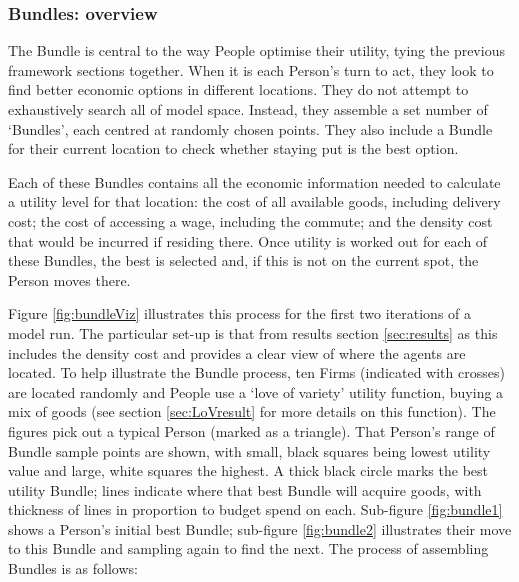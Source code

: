 \subsubsection{Bundles: overview \label{sec:bundles}}

The Bundle is central to the way People optimise their utility, tying the previous framework sections together. When it is each Person's turn to act, they look to find better economic options in different locations. They do not attempt to exhaustively search all of model space. Instead, they assemble a set number of `Bundles', each centred at randomly chosen points. They also include a Bundle for their current location to check whether staying put is the best option.

Each of these Bundles contains all the economic information needed to calculate a utility level for that location: the cost of all available goods, including delivery cost; the cost of accessing a wage, including the commute; and the density cost that would be incurred if residing there. Once utility is worked out for each of these Bundles, the best is selected and, if this is not on the current spot, the Person moves there.

Figure \ref{fig:bundleViz} illustrates this process for the first two iterations of a model run. The particular set-up is that from results section \ref{sec:results} as this includes the density cost and provides a clear view of where the agents are located. To help illustrate the Bundle process, ten Firms (indicated with crosses) are located randomly and People use a `love of variety' utility function, buying a mix of goods (see section \ref{sec:LoVresult} for more details on this function). The figures pick out a typical Person (marked as a triangle). That Person's range of Bundle sample points are shown, with small, black squares being lowest utility value and large, white squares the highest. A thick black circle marks the best utility Bundle; lines indicate where that best Bundle will acquire goods, with thickness of lines in proportion to budget spend on each. Sub-figure \ref{fig:bundle1} shows a Person's initial best Bundle; sub-figure \ref{fig:bundle2} illustrates their move to this Bundle and sampling again to find the next. The process of assembling Bundles is as follows:

